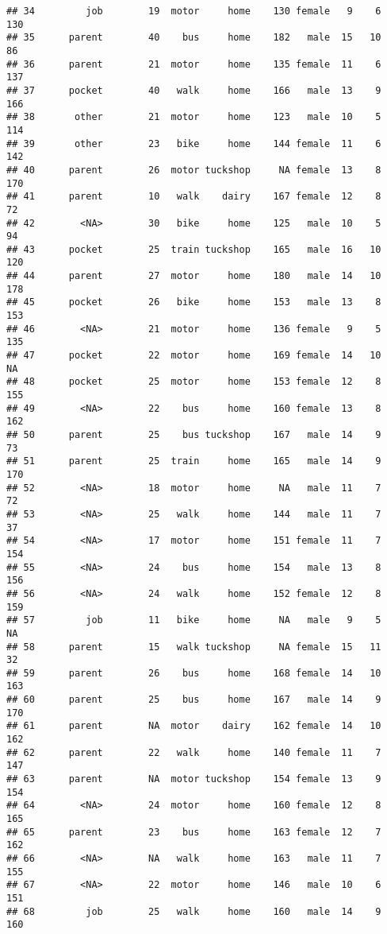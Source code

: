 \documentclass[
]{article}
\begin{document}
\begin{verbatim}
## 34         job        19  motor     home    130 female   9    6     130
## 35      parent        40    bus     home    182   male  15   10      86
## 36      parent        21  motor     home    135 female  11    6     137
## 37      pocket        40   walk     home    166   male  13    9     166
## 38       other        21  motor     home    123   male  10    5     114
## 39       other        23   bike     home    144 female  11    6     142
## 40      parent        26  motor tuckshop     NA female  13    8     170
## 41      parent        10   walk    dairy    167 female  12    8      72
## 42        <NA>        30   bike     home    125   male  10    5      94
## 43      pocket        25  train tuckshop    165   male  16   10     120
## 44      parent        27  motor     home    180   male  14   10     178
## 45      pocket        26   bike     home    153   male  13    8     153
## 46        <NA>        21  motor     home    136 female   9    5     135
## 47      pocket        22  motor     home    169 female  14   10      NA
## 48      pocket        25  motor     home    153 female  12    8     155
## 49        <NA>        22    bus     home    160 female  13    8     162
## 50      parent        25    bus tuckshop    167   male  14    9      73
## 51      parent        25  train     home    165   male  14    9     170
## 52        <NA>        18  motor     home     NA   male  11    7      72
## 53        <NA>        25   walk     home    144   male  11    7      37
## 54        <NA>        17  motor     home    151 female  11    7     154
## 55        <NA>        24    bus     home    154   male  13    8     156
## 56        <NA>        24   walk     home    152 female  12    8     159
## 57         job        11   bike     home     NA   male   9    5      NA
## 58      parent        15   walk tuckshop     NA female  15   11      32
## 59      parent        26    bus     home    168 female  14   10     163
## 60      parent        25    bus     home    167   male  14    9     170
## 61      parent        NA  motor    dairy    162 female  14   10     162
## 62      parent        22   walk     home    140 female  11    7     147
## 63      parent        NA  motor tuckshop    154 female  13    9     154
## 64        <NA>        24  motor     home    160 female  12    8     165
## 65      parent        23    bus     home    163 female  12    7     162
## 66        <NA>        NA   walk     home    163   male  11    7     155
## 67        <NA>        22  motor     home    146   male  10    6     151
## 68         job        25   walk     home    160   male  14    9     160

\end{verbatim}
\end{document}
